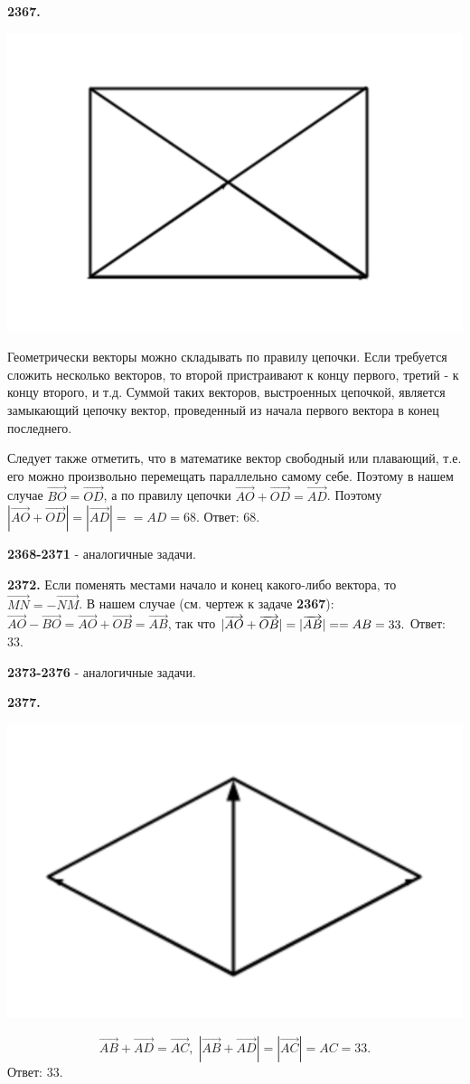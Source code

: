\textbf{2367.}

{\centering \includegraphics[width=0.5\linewidth]{Geometry/Content/56.png}
	
}

Геометрически векторы можно складывать по правилу цепочки. Если требуется сложить несколько векторов, то второй пристраивают к концу первого, третий - к концу второго, и т.д. Суммой таких векторов, выстроенных цепочкой, является замыкающий цепочку вектор, проведенный из начала первого вектора в конец последнего. 

Следует также отметить, что в математике вектор свободный или плавающий, т.е. его можно произвольно перемещать параллельно самому себе. Поэтому в нашем случае $\overrightarrow{BO}=\overrightarrow{OD}$, а по правилу цепочки $\overrightarrow{AO}+\overrightarrow{OD}=\overrightarrow{AD}$. Поэтому $|\overrightarrow{AO}+\overrightarrow{OD}|=|\overrightarrow{AD}|=$\newline$=AD=68.$ \newline \null \hspace*{\fill} Ответ: 68.

\textbf{2368-2371} - аналогичные задачи. 

\textbf{2372.} Если поменять местами начало и конец какого-либо вектора, то $\overrightarrow{MN}=-\overrightarrow{NM}$. В нашем случае (см. чертеж к задаче \textbf{2367}): $\overrightarrow{AO} - \overrightarrow{BO} = \overrightarrow{AO} + \overrightarrow{OB} = \overrightarrow{AB}$, так что $|\overrightarrow{AO}+\overrightarrow{OB}|=|\overrightarrow{AB}|=\linebreak=AB=33.$ \newline \null \hspace*{\fill} Ответ: 33.

\textbf{2373-2376} - аналогичные задачи.

\textbf{2377.}

{\centering \includegraphics[width=0.5\linewidth]{Geometry/Content/57.png}
	
}
\[
\overrightarrow{AB}+\overrightarrow{AD}=\overrightarrow{AC}, \; |\overrightarrow{AB} + \overrightarrow{AD}| = |\overrightarrow{AC}|=AC=33.
\] \newline \null \hspace*{\fill} Ответ: 33.


